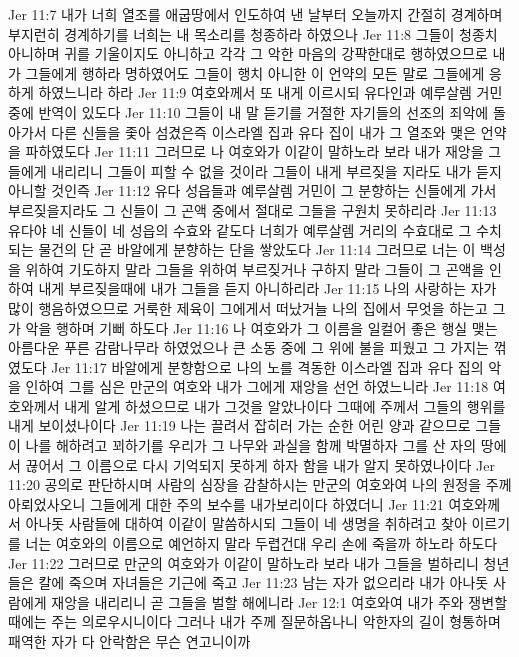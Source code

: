 Jer 11:7  내가 너희 열조를 애굽땅에서 인도하여 낸 날부터 오늘까지 간절히 경계하며 부지런히 경계하기를 너희는 내 목소리를 청종하라 하였으나
Jer 11:8  그들이 청종치 아니하며 귀를 기울이지도 아니하고 각각 그 악한 마음의 강퍅한대로 행하였으므로 내가 그들에게 행하라 명하였어도 그들이 행치 아니한 이 언약의 모든 말로 그들에게 응하게 하였느니라 하라
Jer 11:9  여호와께서 또 내게 이르시되 유다인과 예루살렘 거민 중에 반역이 있도다
Jer 11:10  그들이 내 말 듣기를 거절한 자기들의 선조의 죄악에 돌아가서 다른 신들을 좇아 섬겼은즉 이스라엘 집과 유다 집이 내가 그 열조와 맺은 언약을 파하였도다
Jer 11:11  그러므로 나 여호와가 이같이 말하노라 보라 내가 재앙을 그들에게 내리리니 그들이 피할 수 없을 것이라 그들이 내게 부르짖을 지라도 내가 듣지 아니할 것인즉
Jer 11:12  유다 성읍들과 예루살렘 거민이 그 분향하는 신들에게 가서 부르짖을지라도 그 신들이 그 곤액 중에서 절대로 그들을 구원치 못하리라
Jer 11:13  유다야 네 신들이 네 성읍의 수효와 같도다 너희가 예루살렘 거리의 수효대로 그 수치되는 물건의 단 곧 바알에게 분향하는 단을 쌓았도다
Jer 11:14  그러므로 너는 이 백성을 위하여 기도하지 말라 그들을 위하여 부르짖거나 구하지 말라 그들이 그 곤액을 인하여 내게 부르짖을때에 내가 그들을 듣지 아니하리라
Jer 11:15  나의 사랑하는 자가 많이 행음하였으므로 거룩한 제육이 그에게서 떠났거늘 나의 집에서 무엇을 하는고 그가 악을 행하며 기뻐 하도다
Jer 11:16  나 여호와가 그 이름을 일컬어 좋은 행실 맺는 아름다운 푸른 감람나무라 하였었으나 큰 소동 중에 그 위에 불을 피웠고 그 가지는 꺾였도다
Jer 11:17  바알에게 분향함으로 나의 노를 격동한 이스라엘 집과 유다 집의 악을 인하여 그를 심은 만군의 여호와 내가 그에게 재앙을 선언 하였느니라
Jer 11:18  여호와께서 내게 알게 하셨으므로 내가 그것을 알았나이다 그때에 주께서 그들의 행위를 내게 보이셨나이다
Jer 11:19  나는 끌려서 잡히러 가는 순한 어린 양과 같으므로 그들이 나를 해하려고 꾀하기를 우리가 그 나무와 과실을 함께 박멸하자 그를 산 자의 땅에서 끊어서 그 이름으로 다시 기억되지 못하게 하자 함을 내가 알지 못하였나이다
Jer 11:20  공의로 판단하시며 사람의 심장을 감찰하시는 만군의 여호와여 나의 원정을 주께 아뢰었사오니 그들에게 대한 주의 보수를 내가보리이다 하였더니
Jer 11:21  여호와께서 아나돗 사람들에 대하여 이같이 말씀하시되 그들이 네 생명을 취하려고 찾아 이르기를 너는 여호와의 이름으로 예언하지 말라 두렵건대 우리 손에 죽을까 하노라 하도다
Jer 11:22  그러므로 만군의 여호와가 이같이 말하노라 보라 내가 그들을 벌하리니 청년들은 칼에 죽으며 자녀들은 기근에 죽고
Jer 11:23  남는 자가 없으리라 내가 아나돗 사람에게 재앙을 내리리니 곧 그들을 벌할 해에니라
Jer 12:1  여호와여 내가 주와 쟁변할 때에는 주는 의로우시니이다 그러나 내가 주께 질문하옵나니 악한자의 길이 형통하며 패역한 자가 다 안락함은 무슨 연고니이까
